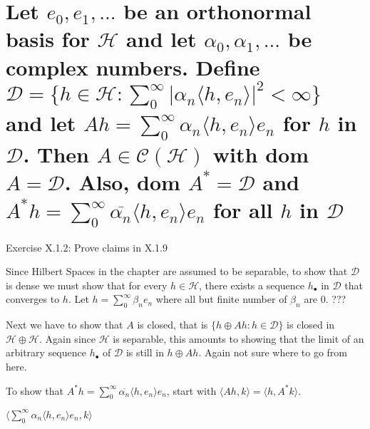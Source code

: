 \documentclass{article}
\newcommand*\conj[1]{\overline{#1}}
\begin{document}
\section{Let $e_0, e_1, ...$ be an orthonormal basis for $\mathscr{H}$ and let $\alpha_0, \alpha_1, ...$ be complex numbers. Define $\mathscr{D} = \{ h \in \mathscr{H} :  \sum_{0}^{\infty} | \alpha_n \langle h, e_n \rangle |^2 < \infty \}$ and let $Ah= \sum_{0}^{\infty} \alpha_n \langle h, e_n \rangle e_n$ for $h$ in $\mathscr{D}$. Then $A \in \mathscr{C}(\mathscr{H})$ with dom $A=\mathscr{D}$. Also, dom $A^*=\mathscr{D}$ and $A^*h=\sum_{0}^{\infty} \conj{\alpha_n} \langle h, e_n \rangle e_n$ for all $h$ in $\mathscr{D}$}

Exercise X.1.2: Prove claims in X.1.9

Since Hilbert Spaces in the chapter are assumed to be separable, to show that $\mathscr{D}$ is dense we must show that for every $h \in \mathscr{H}$, there exists a sequence $h_{\bullet}$ in $\mathscr{D}$ that converges to $h$. Let $h = \sum_{0}^{\infty} \beta_n e_n$ where all but finite number of $\beta_n$ are 0. ???

Next we have to show that $A$ is closed, that is $\{ h \oplus Ah : h \in \mathscr{D}\}$ is closed in $\mathscr{H} \oplus \mathscr{H}$. Again since $\mathscr{H}$ is separable, this amounts to showing that the limit of an arbitrary sequence $h_{\bullet}$ of $\mathscr{D}$ is still in $h \oplus Ah$. Again not sure where to go from here.

To show that $A^*h=\sum_{0}^{\infty} \conj{\alpha_n} \langle h, e_n \rangle e_n$, start with $\langle Ah, k \rangle = \langle h, A^*k \rangle$. 

$ \langle \sum_{0}^{\infty} \alpha_n \langle h, e_n \rangle e_n, k \rangle$
\end{document}
